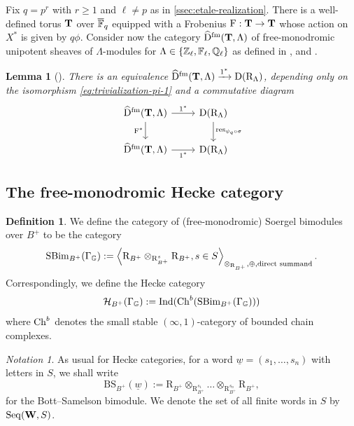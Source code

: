 \documentclass[a4paper, 10pt, oneside, reqno]{amsart}
\theoremstyle{plain}
\newtheorem{lem}[thm]{Lemma}
\theoremstyle{definition}
\newtheorem{defi}[thm]{Definition}
\theoremstyle{remark}
\newtheorem{nota}[thm]{Notation}
\newcommand{\Gbb}{\mathbb{G}}
\newcommand{\RR}{\mathrm{R}}
\newcommand{\BS}{\mathrm{BS}}
\newcommand{\fm}{\mathrm{fm}}
\newcommand{\Seq}{\mathrm{Seq}}
\newcommand{\restr}{\mathrm{res}}
\begin{document}
Fix $q = p^r$ with $r \geq 1$ and $\ell \neq p$ as in \ref{ssec:etale-realization}. There is a well-defined torus $\mathbf{T}$ over $\overline{\mathbb{F}}_q$ equipped with a Frobenius $\mathrm{F} : \mathbf{T} \to \mathbf{T}$ whose action on $X^*$ is given by $q\phi$. Consider now the category $\widehat{\DD}^{\fm}(\Tbf, \Lambda)$ of free-monodromic unipotent sheaves of $\Lambda$-modules for $\Lambda \in \{\mathbb{Z}_{\ell}, \mathbb{F}_{\ell}, \mathbb{Q}_{\ell}\}$ as defined in \cite[Appendix A]{BezYun}, \cite[Sections 2--5]{BezrukavnikovRiche}
and \cite[Sections 2.3--2.7]{EteveFreeMono}.

\begin{lem}[]\label{lem:compat-with-frobenius-on-rt}
There is an equivalence $\widehat{\DD}^{\fm}(\Tbf, \Lambda) \xrightarrow{1^*} \DD(\RR_{\Lambda})$, depending only on the isomorphism \eqref{eq:trivialization-pi-1} 
and a commutative diagram
\[\begin{tikzcd}
	{\widehat{\DD}^{\fm}(\Tbf, \Lambda) } & { \DD(\RR_{\Lambda})} \\
	{\widehat{\DD}^{\fm}(\Tbf, \Lambda) } & { \DD(\RR_{\Lambda})}
	\arrow["{1^*}", from=1-1, to=1-2]
	\arrow["{\Frob^*}"', from=1-1, to=2-1]
	\arrow["{\restr_{\psi_q \circ \sigma}}", from=1-2, to=2-2]
	\arrow["{1^*}"', from=2-1, to=2-2]
\end{tikzcd}\]
\end{lem}

\subsection{The free-monodromic Hecke category}

\begin{defi}
We define the category of (free-monodromic) Soergel bimodules over $B^+$ to be the category 
$$\SBim_{B^+}(\Gamma_{\Gbb}) := \left\langle \RR_{B^+} \otimes_{\RR_{B^+}^s} \RR_{B^+}, s \in S \right\rangle_{\otimes_{\RR_{B^+}}, \oplus, \text{direct summand}}.$$
Correspondingly, we define the Hecke category 
$$\Hcal_{B^+}(\Gamma_{\Gbb}) := \Ind(\Ch^b(\SBim_{B^+}(\Gamma_{\Gbb})))$$
where $\mathrm{Ch}^b$ denotes the small stable $(\infty,1)$-category of bounded chain complexes. 
\end{defi}

\begin{nota}
As usual for Hecke categories, for a word $\underline{w} = (s_1, \dots, s_n)$ with letters in $S$, we shall write 
$$\BS_{B^+}(\underline{w}) := \RR_{B^+} \otimes_{\RR^{s_1}_{B^+}} \dots \otimes_{\RR_{B^+}^{s_n}} \RR_{B^+},$$
for the Bott--Samelson bimodule.  We denote the set of all finite words in $S$ by $\Seq(\Wbf,S)$.
\end{nota} 
\end{document}
